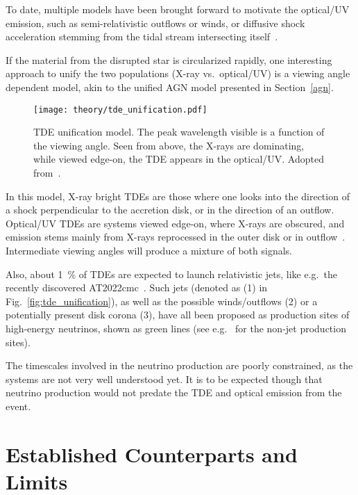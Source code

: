 To date, multiple models have been brought forward to motivate the optical/UV emission, such as semi-relativistic outflows or winds, or diffusive shock acceleration stemming from the tidal stream intersecting itself~\cite{Gezari2021}.

If the material from the disrupted star is circularized rapidly, one interesting approach to unify the two populations (X-ray vs.\ optical/UV) is a viewing angle dependent model, akin to the unified AGN model presented in Section~\ref{agn}.

\begin{figure}[htb]
    \texttt{[image: theory/tde\_unification.pdf]}
    \caption[TDE Unification]{TDE unification model. The peak wavelength visible is a function of the viewing angle. Seen from above, the X-rays are dominating, while viewed edge-on, the TDE appears in the optical/UV\@. Adopted from~\cite{Hayasaki2021}.}
\end{figure}

In this model, X-ray bright TDEs are those where one looks into the direction of a shock perpendicular to the accretion disk, or in the direction of an outflow. Optical/UV TDEs are systems viewed edge-on, where X-rays are obscured, and emission stems mainly from X-rays reprocessed in the outer disk or in outflow~. Intermediate viewing angles will produce a mixture of both signals.

Also, about \SI{1}{\percent} of TDEs are expected to launch relativistic jets, like e.g.\ the recently discovered AT2022cmc~. Such jets (denoted as (1) in Fig.~\ref{fig:tde_unification}), as well as the possible winds/outflows (2) or a potentially present disk corona (3), have all been proposed as production sites of high-energy neutrinos, shown as green lines (see e.g.~ for the non-jet production sites).

The timescales involved in the neutrino production are poorly constrained, as the systems are not very well understood yet. It is to be expected though that neutrino production would not predate the TDE and optical emission from the event.

\section{Established Counterparts and Limits}

